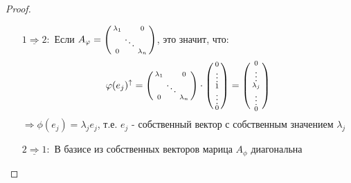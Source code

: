     \begin{proof} \tab
        \begin{itemize}
            \item[$\underline{1 \Rightarrow  2}:$] Если $A_\phi = \left(\begin{smallmatrix}
                \lambda_1 & \null & 0 \\
                \null & \ddots & \null \\
                0 & \null & \lambda_n
            \end{smallmatrix}\right)$, это значит, что: 
            $$\phi(e_j)^\uparrow = \left(\begin{smallmatrix}
                \lambda_1 & \null & 0 \\
                \null & \ddots & \null \\
                0 & \null & \lambda_n
            \end{smallmatrix}\right) \cdot \left(\begin{smallmatrix}
                0 \\
                \vdots \\
                1 \\
                \vdots \\
                0
            \end{smallmatrix}\right) = \left(\begin{smallmatrix}
                0 \\
                \vdots \\
                \lambda_j \\
                \vdots \\
                0
            \end{smallmatrix}\right)$$ $\Longrightarrow \phi(e_j) = \lambda_j e_j$, т.е. $e_j$ - собственный вектор с собственным значением $\lambda_j$    

            \item[$\underline{2 \Rightarrow  1}:$] В базисе из собственных векторов марица $A_\phi$ диагональна
            

\end{itemize}
\end{proof}
